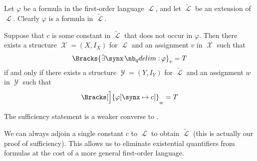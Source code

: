 \begin{proposition}\label{thm:existential_quantifier_removal}
  Let \( \varphi \) be a formula in the first-order language \( \mscrL \), and let \( \widetilde \mscrL \) be an extension of \( \mscrL \). Clearly \( \varphi \) is a formula in \( \widetilde \mscrL \).

  Suppose that \( c \) is some constant in \( \widetilde \mscrL \) that does not occur in \( \varphi \). Then there exists a structure \( \mscrX = (X, I_X) \) for \( \mscrL \) and an assignment \( v \) in \( \mscrX \) such that
  \begin{equation*}
    \Bracks{\qexists \synx \varphi}_v = T
  \end{equation*}
  if and only if there exists a structure \( \mscrY = (Y, I_Y) \) for \( \widetilde \mscrL \) and an assignment \( w \) in \( \mscrY \) such that
  \begin{equation*}
    \Bracks[\Big]{\varphi[\synx \mapsto c]}_w = T
  \end{equation*}
\end{proposition}
\begin{comments}
  \item The sufficiency statement is a weaker converse to .
  \item We can always adjoin a single constant \( c \) to \( \mscrL \) to obtain \( \widetilde \mscrL \) (this is actually our proof of sufficiency). This allows us to eliminate existential quantifiers from formulas at the cost of a more general first-order language.
\end{comments}
